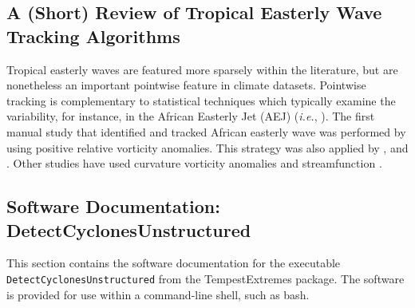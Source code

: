\documentclass[gmdd, hvmath, online]{copernicus_discussions}
\begin{document}
\subsection{A (Short) Review of Tropical Easterly Wave Tracking Algorithms} \label{sec:TropicalEasterlyWaveAlgorithms}


Tropical easterly waves are featured more sparsely within the literature, but are nonetheless an important pointwise feature in climate datasets.  Pointwise tracking is complementary to statistical techniques which typically examine the variability, for instance, in the African Easterly Jet (AEJ) (\textit{i.e.}, \cite{ceron1999validation}).  The first manual study that identified and tracked African easterly wave was performed by \cite{reed1988evaluation} using positive relative vorticity anomalies.  This strategy was also applied by \cite{thorncroft2001african}, \cite{hodges2003comparison} and \cite{serra2010tracking}.  Other studies have used curvature vorticity anomalies \cite{belanger2014african, bain2014objective} and streamfunction \citep{berry2007african}.%




\subsection{Software Documentation: DetectCyclonesUnstructured} \label{sec:DetectCyclonesUnstructuredAppendix}

This section contains the software documentation for the executable \texttt{DetectCyclonesUnstructured} from the TempestExtremes package.  The software is provided for use within a command-line shell, such as bash.
\end{document}
